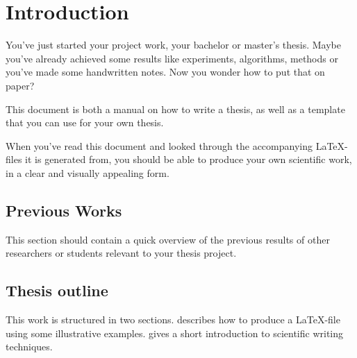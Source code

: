 \chapter{Introduction}
\label{chap:intro}

You've just started your project work, your bachelor or master's thesis. 
Maybe you've already achieved some results like experiments, algorithms, methods or you've made some handwritten notes. 
Now you wonder how to put that on paper?

This document is both a manual on how to write a thesis, as well as a template that you can use for your own thesis.

When you've read this document and looked through the accompanying \LaTeX-files it is generated from, you should be able to produce your own scientific work, in a clear and visually appealing form.


\section{Previous Works}
This section should contain a quick overview of the previous results of other researchers or students relevant to your thesis project.

\section{Thesis outline}
This work is structured in two sections. 
 describes how to produce a \LaTeX-file using some illustrative examples. 
 gives a short introduction to scientific writing techniques.



